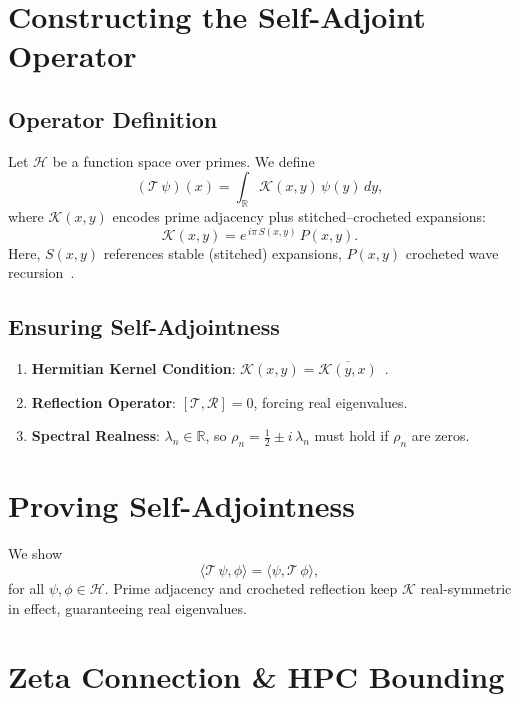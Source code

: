 \documentclass[aps,prl,twocolumn,amsmath,amssymb,nofootinbib]{revtex4-2}
\begin{document}
\section{Constructing the Self-Adjoint Operator}
\subsection{Operator Definition}
Let $\mathcal{H}$ be a function space over primes. We define
\begin{equation}
(\mathcal{T}\,\psi)(x) = \int_{\mathbb{R}} \mathcal{K}(x,y)\,\psi(y)\,dy,
\end{equation}
where $\mathcal{K}(x,y)$ encodes prime adjacency plus stitched--crocheted expansions:
\begin{equation}
\mathcal{K}(x,y) = e^{\,i\pi\,S(x,y)}\,P(x,y).
\end{equation}
Here, $S(x,y)$ references stable (stitched) expansions, $P(x,y)$ crocheted wave recursion~\cite{RoodCrochet}.

\subsection{Ensuring Self-Adjointness}
\begin{enumerate}
\item \textbf{Hermitian Kernel Condition}: $\mathcal{K}(x,y) = \overline{\mathcal{K}(y,x)}$~\cite{HilbertPolya}.
\item \textbf{Reflection Operator}: $[\mathcal{T},\mathcal{R}]=0$, forcing real eigenvalues.
\item \textbf{Spectral Realness}: $\lambda_n\in\mathbb{R}$, so $\rho_n=\tfrac12 \pm i\,\lambda_n$ must hold if $\rho_n$ are zeros.
\end{enumerate}

\section{Proving Self-Adjointness}
We show
\begin{equation}
\langle \mathcal{T}\,\psi,\phi\rangle = \langle \psi,\mathcal{T}\,\phi\rangle,
\end{equation}
for all $\psi,\phi\in\mathcal{H}$. Prime adjacency and crocheted reflection keep $\mathcal{K}$ real-symmetric in effect, guaranteeing real eigenvalues.

\section{Zeta Connection \& HPC Bounding}
\end{document}
